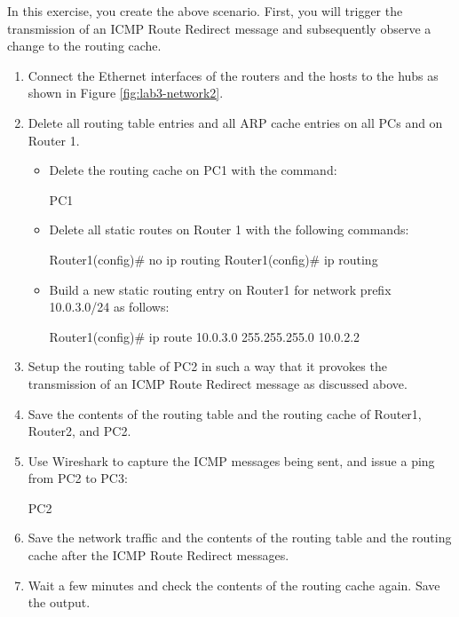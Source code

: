 In this exercise, you create the above scenario. First, you will trigger the transmission of an ICMP Route Redirect message and subsequently observe a change to the routing cache.
\begin{enumerate}
	\item Connect the Ethernet interfaces of the routers and the hosts to the hubs as shown in Figure \ref{fig:lab3-network2}.
	\item Delete all routing table entries and all ARP cache entries on all PCs and on Router 1. 
		\begin{itemize}
			\item Delete the routing cache on PC1 with the command:
				\begin{cmdblock}
	PC1%
				\end{cmdblock}
			\item Delete all static routes on Router 1 with the following commands: 
				\begin{cmdblock}
	Router1(config)# no ip routing
	Router1(config)# ip routing
				\end{cmdblock}
			\item Build a new static routing entry on Router1 for network prefix 10.0.3.0/24 as follows:
				\begin{cmdblock}
	Router1(config)# ip route 10.0.3.0 255.255.255.0 10.0.2.2
				\end{cmdblock}
		\end{itemize}
	\item Setup the routing table of PC2 in such a way that it provokes the transmission of an ICMP Route Redirect message as discussed above.
	\item Save the contents of the routing table and the routing cache of Router1, Router2, and PC2.
	\item Use Wireshark to capture the ICMP messages being sent, and issue a ping from PC2 to PC3:
		\begin{cmdblock}
	PC2%
		\end{cmdblock}
	\item Save the network traffic and the contents of the routing table and the routing cache after the ICMP Route Redirect messages.
	\item Wait a few minutes and check the contents of the routing cache again. Save the output.
\end{enumerate}

\begin{questions}
\end{questions}

